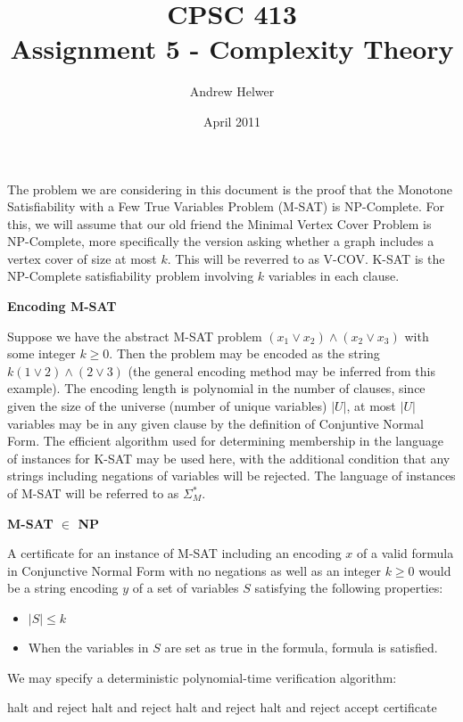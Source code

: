 \documentclass{article}
\begin{document}
\title{CPSC 413 \\ Assignment 5 - Complexity Theory}
\author{Andrew Helwer}
\date{April 2011}
\maketitle

The problem we are considering in this document is the proof that the Monotone Satisfiability with a Few True Variables Problem (M-SAT) is NP-Complete. For this, we will assume that our old friend the Minimal Vertex Cover Problem is NP-Complete, more specifically the version asking whether a graph includes a vertex cover of size at most $k$. This will be reverred to as V-COV. K-SAT is the NP-Complete satisfiability problem involving $k$ variables in each clause.

\textbf{Encoding M-SAT}

Suppose we have the abstract M-SAT problem $(x_1 \vee x_2) \wedge (x_2 \vee x_3)$ with some integer $k \geq 0$. Then the problem may be encoded as the string $k(1 \vee 2) \wedge (2 \vee 3)$ (the general encoding method may be inferred from this example). The encoding length is polynomial in the number of clauses, since given the size of the universe (number of unique variables) $|U|$, at most $|U|$ variables may be in any given clause by the definition of Conjuntive Normal Form. The efficient algorithm used for determining membership in the language of instances for K-SAT may be used here, with the additional condition that any strings including negations of variables will be rejected. The language of instances of M-SAT will be referred to as $\Sigma ^\ast _M$.

\textbf{M-SAT $\in$ NP}

A certificate for an instance of M-SAT including an encoding $x$ of a valid formula in Conjunctive Normal Form with no negations as well as an integer $k \geq 0$ would be a string encoding $y$ of a set of variables $S$ satisfying the following properties:

\begin{itemize}
\item $|S| \leq k$
\item When the variables in $S$ are set as true in the formula, formula is satisfied.
\end{itemize}

We may specify a deterministic polynomial-time verification algorithm:

\begin{algorithmic}[1]
	\STATE halt and reject
\ENDIF
{}
	\STATE halt and reject
\ENDIF
{}
	\STATE halt and reject
\ENDIF
{}
	\STATE halt and reject
\ENDIF
\STATE accept certificate
\end{algorithmic}
\end{document}
